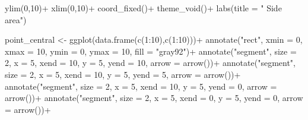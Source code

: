 \documentclass[
  letterpaper,
  DIV=11,
  numbers=noendperiod]{scrreprt}
\newenvironment{Shaded}{\begin{snugshade}}{\end{snugshade}}
\newcommand{\AttributeTok}[1]{\textcolor[rgb]{0.40,0.45,0.13}{#1}}
\newcommand{\DecValTok}[1]{\textcolor[rgb]{0.68,0.00,0.00}{#1}}
\newcommand{\FunctionTok}[1]{\textcolor[rgb]{0.28,0.35,0.67}{#1}}
\newcommand{\NormalTok}[1]{\textcolor[rgb]{0.00,0.23,0.31}{#1}}
\newcommand{\OtherTok}[1]{\textcolor[rgb]{0.00,0.23,0.31}{#1}}
\newcommand{\SpecialCharTok}[1]{\textcolor[rgb]{0.37,0.37,0.37}{#1}}
\newcommand{\StringTok}[1]{\textcolor[rgb]{0.13,0.47,0.30}{#1}}
\begin{document}
\begin{Shaded}
\begin{Highlighting}[]
  \FunctionTok{ylim}\NormalTok{(}\DecValTok{0}\NormalTok{,}\DecValTok{10}\NormalTok{)}\SpecialCharTok{+}
  \FunctionTok{xlim}\NormalTok{(}\DecValTok{0}\NormalTok{,}\DecValTok{10}\NormalTok{)}\SpecialCharTok{+}
  \FunctionTok{coord\_fixed}\NormalTok{()}\SpecialCharTok{+}
  \FunctionTok{theme\_void}\NormalTok{()}\SpecialCharTok{+}
  \FunctionTok{labs}\NormalTok{(}\AttributeTok{title =} \StringTok{"      Side area"}\NormalTok{)}

\NormalTok{point\_central }\OtherTok{\textless{}{-}} \FunctionTok{ggplot}\NormalTok{(}\FunctionTok{data.frame}\NormalTok{(}\FunctionTok{c}\NormalTok{(}\DecValTok{1}\SpecialCharTok{:}\DecValTok{10}\NormalTok{),}\FunctionTok{c}\NormalTok{(}\DecValTok{1}\SpecialCharTok{:}\DecValTok{10}\NormalTok{)))}\SpecialCharTok{+}
  \FunctionTok{annotate}\NormalTok{(}\StringTok{"rect"}\NormalTok{, }\AttributeTok{xmin =} \DecValTok{0}\NormalTok{, }\AttributeTok{xmax =} \DecValTok{10}\NormalTok{, }\AttributeTok{ymin =} \DecValTok{0}\NormalTok{, }\AttributeTok{ymax =} \DecValTok{10}\NormalTok{, }\AttributeTok{fill =} \StringTok{"gray92"}\NormalTok{)}\SpecialCharTok{+}
  \FunctionTok{annotate}\NormalTok{(}\StringTok{"segment"}\NormalTok{, }\AttributeTok{size =} \DecValTok{2}\NormalTok{, }\AttributeTok{x =} \DecValTok{5}\NormalTok{, }\AttributeTok{xend =} \DecValTok{10}\NormalTok{, }\AttributeTok{y =} \DecValTok{5}\NormalTok{, }\AttributeTok{yend =} \DecValTok{10}\NormalTok{, }\AttributeTok{arrow =} \FunctionTok{arrow}\NormalTok{())}\SpecialCharTok{+}
  \FunctionTok{annotate}\NormalTok{(}\StringTok{"segment"}\NormalTok{, }\AttributeTok{size =} \DecValTok{2}\NormalTok{, }\AttributeTok{x =} \DecValTok{5}\NormalTok{, }\AttributeTok{xend =} \DecValTok{10}\NormalTok{, }\AttributeTok{y =} \DecValTok{5}\NormalTok{, }\AttributeTok{yend =} \DecValTok{5}\NormalTok{, }\AttributeTok{arrow =} \FunctionTok{arrow}\NormalTok{())}\SpecialCharTok{+}
  \FunctionTok{annotate}\NormalTok{(}\StringTok{"segment"}\NormalTok{, }\AttributeTok{size =} \DecValTok{2}\NormalTok{, }\AttributeTok{x =} \DecValTok{5}\NormalTok{, }\AttributeTok{xend =} \DecValTok{10}\NormalTok{, }\AttributeTok{y =} \DecValTok{5}\NormalTok{, }\AttributeTok{yend =} \DecValTok{0}\NormalTok{, }\AttributeTok{arrow =} \FunctionTok{arrow}\NormalTok{())}\SpecialCharTok{+}
  \FunctionTok{annotate}\NormalTok{(}\StringTok{"segment"}\NormalTok{, }\AttributeTok{size =} \DecValTok{2}\NormalTok{, }\AttributeTok{x =} \DecValTok{5}\NormalTok{, }\AttributeTok{xend =} \DecValTok{0}\NormalTok{, }\AttributeTok{y =} \DecValTok{5}\NormalTok{, }\AttributeTok{yend =} \DecValTok{0}\NormalTok{, }\AttributeTok{arrow =} \FunctionTok{arrow}\NormalTok{())}\SpecialCharTok{+}

\end{Highlighting}
\end{Shaded}
\end{document}
